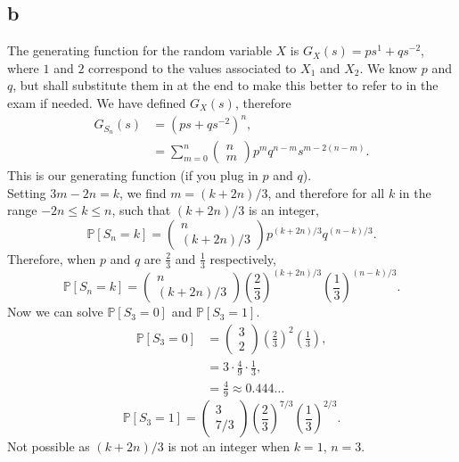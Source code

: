 \documentclass{article}
\begin{document}
\subsection{b}
The generating function for the random variable $X$ is $G_X(s) = ps^1 + qs^{-2}$, where $1$ and $2$ correspond to the values associated to $X_1$ and $X_2$.  We know $p$ and $q$, but shall substitute them in at the end to make this better to refer to in the exam if needed. We have defined $G_X(s)$, therefore
\begin{align}
    G_{S_n}(s) &= (ps+qs^{-2})^n,\\
    &= \sum_{m=0}^n\begin{pmatrix}
        n\\m
    \end{pmatrix}p^mq^{n-m}s^{m-2(n-m)}.
\end{align}
This is our generating function (if you plug in $p$ and $q$).\\
Setting $3m - 2n = k$, we find $m=(k+2n)/3$, and therefore for all $k$ in the range $-2n\leq k\leq n$, such that  $(k+2n)/3$ is an integer, 
\begin{equation}
    \mathbb{P}[S_n=k] = \begin{pmatrix}
        n\\(k+2n)/3
    \end{pmatrix}p^{(k+2n)/3}q^{(n-k)/3}.
\end{equation}
Therefore, when $p$ and $q$ are $\frac{2}{3}$ and $\frac{1}{3}$ respectively,
\begin{equation}
    \mathbb{P}[S_n=k] = \begin{pmatrix}
        n\\(k+2n)/3
    \end{pmatrix}\left(\frac{2}{3}\right)^{(k+2n)/3}\left(\frac{1}{3}\right)^{(n-k)/3}.
\end{equation}
Now we can solve $\mathbb{P}[S_3=0]$ and $\mathbb{P}[S_3=1]$.
\begin{align}
    \mathbb{P}[S_3=0] &= \begin{pmatrix}
        3\\2
    \end{pmatrix}\left(\frac{2}{3}\right)^{2}\left(\frac{1}{3}\right),\\
    &= 3\cdot \frac{4}{9}\cdot \frac{1}{3},\\
    &= \frac{4}{9}\approx 0.444\ldots
\end{align}
\begin{equation}
    \mathbb{P}[S_3=1] = \begin{pmatrix}
        3\\7/3
    \end{pmatrix}\left(\frac{2}{3}\right)^{7/3}\left(\frac{1}{3}\right)^{2/3}.
\end{equation}
Not possible as $(k+2n)/3$ is not an integer when $k=1,\,n=3$.
\end{document}
